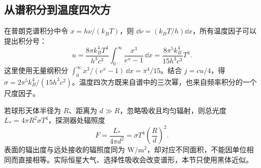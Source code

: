 \subsection{从谱积分到温度四次方}
在普朗克谱积分中令 $x=h\nu/(k_BT)$，则 $\dd\nu=(k_BT/h)\dd x$，所有温度因子可以提出积分号：
\[
 u=\frac{8\pi k_B^4T^4}{h^3c^3}
 \int_0^\infty\frac{x^3}{e^x-1}\,\dd x
 =\frac{8\pi^5k_B^4}{15h^3c^3}T^4.
\]
这里使用无量纲积分 $\int_0^\infty x^3/(e^x-1)\,\dd x=\pi^4/15$。结合 $j=cu/4$，得
$\sigma=2\pi^5k_B^4/(15h^3c^2)$。温度四次方既来自谱中的三次幂，也来自频率积分的一个尺度因子。

若球形天体半径为 $R$、距离为 $d\gg R$，忽略吸收且均匀辐射，则总光度 $L_*=4\pi R^2\sigma T^4$，探测器处辐照度
\[
 F=\frac{L_*}{4\pi d^2}=\sigma T^4\left(\frac Rd\right)^2.
\]
表面的辐出度与远处接收的辐照度同为 $\mathrm{W/m^2}$，却对应不同面积，不能因单位相同而直接相等。实际恒星大气、选择性吸收会改变谱形，本节只使用黑体近似。
